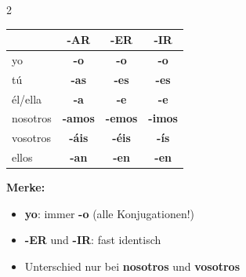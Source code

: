 \documentclass[10pt, a4paper]{article}
\newcommand{\ender}[1]{\textcolor{endungER}{\textbf{#1}}}
\newcommand{\endir}[1]{\textcolor{endungIR}{\textbf{#1}}}
\newcommand{\endar}[1]{\textcolor{endungAR}{\textbf{#1}}}
\begin{document}
\begin{multicols}{2}
\begin{grammatikbox}[Vergleich: -AR / -ER / -IR]
\vspace{2pt}

{\small
\renewcommand{\arraystretch}{1.4}
\begin{tabular}{@{}l|ccc@{}}
& \endar{-AR} & \ender{-ER} & \endir{-IR} \\
\hline
yo & \endar{-o} & \ender{-o} & \endir{-o} \\
tú & \endar{-as} & \ender{-es} & \endir{-es} \\
él/ella & \endar{-a} & \ender{-e} & \endir{-e} \\
nosotros & \endar{-amos} & \ender{-emos} & \endir{-imos} \\
vosotros & \endar{-áis} & \ender{-éis} & \endir{-ís} \\
ellos & \endar{-an} & \ender{-en} & \endir{-en} \\
\end{tabular}}

\vspace{6pt}

{\footnotesize
\textbf{Merke:}
\begin{itemize}[leftmargin=1em, itemsep=1pt]
    \item \textbf{yo}: immer \textbf{-o} (alle Konjugationen!)
    \item \ender{-ER} und \endir{-IR}: fast identisch
    \item Unterschied nur bei \textbf{nosotros} und \textbf{vosotros}
\end{itemize}}

\end{grammatikbox}

\vspace{8pt}


\begin{vokabelbox}

\vspace{2pt}


\end{vokabelbox}
\end{multicols}
\end{document}
